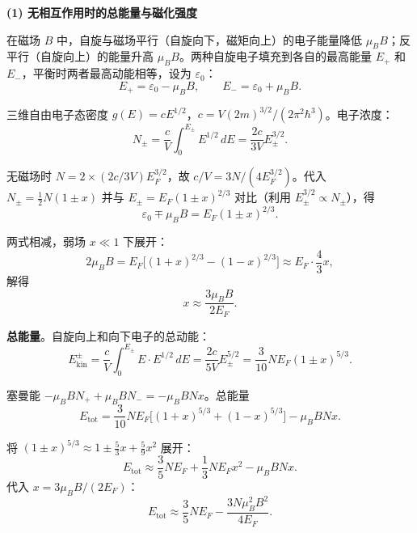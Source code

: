 \begin{derivationbox}[标准解题过程]
\textbf{(1) 无相互作用时的总能量与磁化强度}

在磁场 $B$ 中，自旋与磁场平行（自旋向下，磁矩向上）的电子能量降低 $\mu_BB$；反平行（自旋向上）的能量升高 $\mu_BB$。两种自旋电子填充到各自的最高能量 $E_+$ 和 $E_-$，平衡时两者最高动能相等，设为 $\varepsilon_0$：
\begin{equation}
E_+=\varepsilon_0-\mu_BB,\qquad E_-=\varepsilon_0+\mu_BB.
\end{equation}

三维自由电子态密度 $g(E)=cE^{1/2}$，$c=V(2m)^{3/2}/(2\pi^2\hbar^3)$。电子浓度：
\begin{equation}
N_\pm=\frac{c}{V}\int_0^{E_\pm}E^{1/2}\,dE=\frac{2c}{3V}E_\pm^{3/2}.
\end{equation}

无磁场时 $N=2\times(2c/3V)E_F^{3/2}$，故 $c/V=3N/(4E_F^{3/2})$。代入 $N_\pm=\frac{1}{2}N(1\pm x)$ 并与 $E_\pm=E_F(1\pm x)^{2/3}$ 对比（利用 $E_\pm^{3/2}\propto N_\pm$），得
\begin{equation}
\varepsilon_0\mp\mu_BB=E_F(1\pm x)^{2/3}.
\end{equation}

两式相减，弱场 $x\ll1$ 下展开：
\begin{equation}
2\mu_BB=E_F\bigl[(1+x)^{2/3}-(1-x)^{2/3}\bigr]\approx E_F\cdot\frac{4}{3}x,
\end{equation}
解得
\begin{equation}
\boxed{x\approx\frac{3\mu_BB}{2E_F}.}
\end{equation}

\textbf{总能量}。自旋向上和向下电子的总动能：
\begin{equation}
E_{\text{kin}}^\pm=\frac{c}{V}\int_0^{E_\pm}E\cdot E^{1/2}\,dE=\frac{2c}{5V}E_\pm^{5/2}=\frac{3}{10}NE_F(1\pm x)^{5/3}.
\end{equation}

塞曼能 $-\mu_BBN_++\mu_BBN_-=-\mu_BBNx$。总能量
\begin{equation}
E_{\text{tot}}=\frac{3}{10}NE_F\bigl[(1+x)^{5/3}+(1-x)^{5/3}\bigr]-\mu_BBNx.
\end{equation}

将 $(1\pm x)^{5/3}\approx1\pm\frac{5}{3}x+\frac{5}{9}x^2$ 展开：
\begin{equation}
E_{\text{tot}}\approx\frac{3}{5}NE_F+\frac{1}{3}NE_Fx^2-\mu_BBNx.
\end{equation}
代入 $x=3\mu_BB/(2E_F)$：
\begin{equation}
\boxed{E_{\text{tot}}\approx\frac{3}{5}NE_F-\frac{3N\mu_B^2B^2}{4E_F}.}
\end{equation}


\end{derivationbox}

